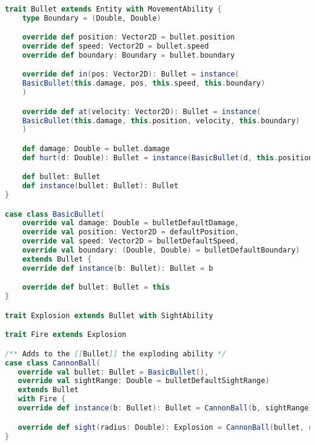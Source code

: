 \begin{lstlisting}[label=code:bullet, language=Scala, caption=Implementazione dei bullet con focus sulla CannonBall]

trait Bullet extends Entity with MovementAbility {
    type Boundary = (Double, Double)

    override def position: Vector2D = bullet.position
    override def speed: Vector2D = bullet.speed
    override def boundary: Boundary = bullet.boundary

    override def in(pos: Vector2D): Bullet = instance(
    BasicBullet(this.damage, pos, this.speed, this.boundary)
    )

    override def at(velocity: Vector2D): Bullet = instance(
    BasicBullet(this.damage, this.position, velocity, this.boundary)
    )

    def damage: Double = bullet.damage
    def hurt(d: Double): Bullet = instance(BasicBullet(d, this.position, this.speed, this.boundary))

    def bullet: Bullet
    def instance(bullet: Bullet): Bullet
}

case class BasicBullet(
    override val damage: Double = bulletDefaultDamage,
    override val position: Vector2D = defaultPosition,
    override val speed: Vector2D = bulletDefaultSpeed,
    override val boundary: (Double, Double) = bulletDefaultBoundary)
    extends Bullet {
    override def instance(b: Bullet): Bullet = b

    override def bullet: Bullet = this
}

trait Explosion extends Bullet with SightAbility

trait Fire extends Explosion

/** Adds to the [[Bullet]] the exploding ability */
case class CannonBall(
   override val bullet: Bullet = BasicBullet(),
   override val sightRange: Double = bulletDefaultSightRange)
   extends Bullet
   with Fire {
   override def instance(b: Bullet): Bullet = CannonBall(b, sightRange)

   override def sight(radius: Double): Explosion = CannonBall(bullet, radius)
}
\end{lstlisting}